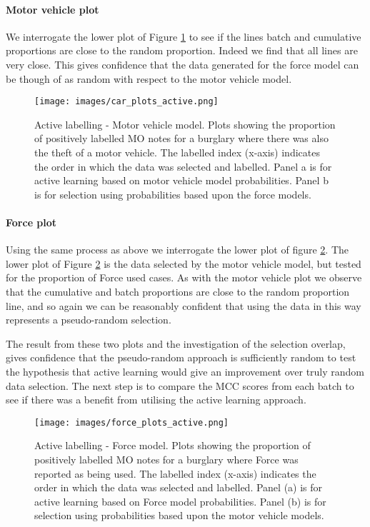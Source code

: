 \paragraph{Motor vehicle plot}We interrogate the lower plot of Figure \ref{fig:active_car} to see if the lines batch and cumulative proportions are close to the random proportion. Indeed we find that all lines are very close. This gives confidence that the data generated for the force model can be though of as random with respect to the motor vehicle model. 

\begin{figure}[!ht]
  \centering
    \texttt{[image: images/car\_plots\_active.png]}
    \caption[Active labelling - Motor vehicle model. ]{{Active labelling - Motor vehicle model.} Plots showing the proportion of positively labelled MO notes for a burglary where there was also the theft of a motor vehicle. The labelled index (x-axis) indicates the order in which the data was selected and labelled. Panel a is for active learning based on motor vehicle model probabilities. Panel b is for selection using probabilities based upon the force models.}
    \label{fig:active_car}
\end{figure}


\paragraph{Force plot} Using the same process as above we interrogate the lower plot of figure \ref{fig:active_force}. The lower plot of Figure \ref{fig:active_force} is the data selected by the motor vehicle model, but tested for the proportion of Force used cases. As with the motor vehicle plot we observe that the cumulative and batch proportions are close to the random proportion line, and so again we can be reasonably confident that using the data in this way represents a pseudo-random selection.

The result from these two plots and the investigation of the selection overlap, gives confidence that the pseudo-random approach is sufficiently random to test the hypothesis that active learning would give an improvement over truly random data selection. The next step is to compare the MCC scores from each batch to see if there was a benefit from utilising the active learning approach.



\begin{figure}[!ht]
  \centering
    \texttt{[image: images/force\_plots\_active.png]}
    \caption[Active labelling - Force model.]{{Active labelling - Force model.} Plots showing the proportion of positively labelled MO notes for a burglary where Force was reported as being used. The labelled index (x-axis) indicates the order in which the data was selected and labelled. Panel (a) is for active learning based on Force model probabilities. Panel (b) is for selection using probabilities based upon the motor vehicle models.}
    \label{fig:active_force}
\end{figure}



